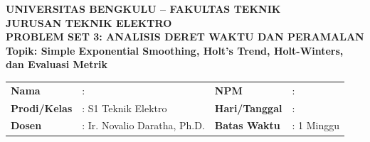\documentclass[11pt,a4paper]{article}
\begin{document}
\begin{center}
    {\large \textbf{\color{primaryblue}UNIVERSITAS BENGKULU -- FAKULTAS TEKNIK}}\\[0.1cm]
    {\large \textbf{\color{secondaryblue}JURUSAN TEKNIK ELEKTRO}}\\[0.2cm]
    {\LARGE \textbf{\color{primaryblue}PROBLEM SET 3: ANALISIS DERET WAKTU DAN PERAMALAN}}\\[0.1cm]
    {\normalsize \textbf{Topik: Simple Exponential Smoothing, Holt's Trend, Holt-Winters, dan Evaluasi Metrik}}
\end{center}

\vspace{0.1cm}

\begin{tcolorbox}[colback=boxbg,colframe=primaryblue,arc=2mm,title=\textbf{Informasi Tugas \& Identitas Mahasiswa}]
\small
\begin{tabular}{p{2.2cm}p{5.5cm}p{2.2cm}p{5.0cm}}
\textbf{Nama} & : \dotfill & \textbf{NPM} & : \dotfill \\
\textbf{Prodi/Kelas} & : S1 Teknik Elektro & \textbf{Hari/Tanggal} & : \dotfill \\
\textbf{Dosen} & : Ir. Novalio Daratha, Ph.D. & \textbf{Batas Waktu} & : 1 Minggu \\
\end{tabular}
\end{tcolorbox}

\vspace{0.2cm}
\end{document}

